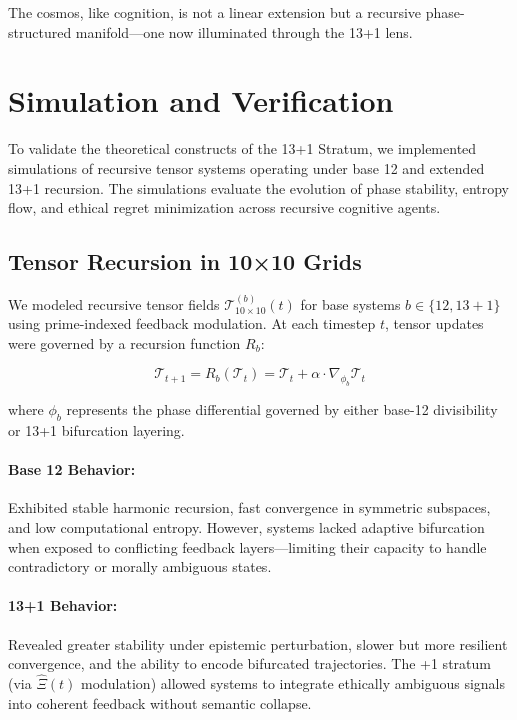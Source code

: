 \documentclass[12pt]{article}
\begin{document}
The cosmos, like cognition, is not a linear extension but a recursive phase-structured manifold—one now illuminated through the 13+1 lens.

\section{Simulation and Verification}

To validate the theoretical constructs of the 13+1 Stratum, we implemented simulations of recursive tensor systems operating under base 12 and extended 13+1 recursion. The simulations evaluate the evolution of phase stability, entropy flow, and ethical regret minimization across recursive cognitive agents.

\subsection{Tensor Recursion in 10×10 Grids}

We modeled recursive tensor fields $\mathcal{T}^{(b)}_{10 \times 10}(t)$ for base systems $b \in \{12, 13+1\}$ using prime-indexed feedback modulation. At each timestep $t$, tensor updates were governed by a recursion function $R_b$:

\[
\mathcal{T}_{t+1} = R_b(\mathcal{T}_t) = \mathcal{T}_t + \alpha \cdot \nabla_{\phi_b} \mathcal{T}_t
\]

where $\phi_b$ represents the phase differential governed by either base-12 divisibility or 13+1 bifurcation layering.

\paragraph{Base 12 Behavior:}  
Exhibited stable harmonic recursion, fast convergence in symmetric subspaces, and low computational entropy. However, systems lacked adaptive bifurcation when exposed to conflicting feedback layers—limiting their capacity to handle contradictory or morally ambiguous states.

\paragraph{13+1 Behavior:}  
Revealed greater stability under epistemic perturbation, slower but more resilient convergence, and the ability to encode bifurcated trajectories. The +1 stratum (via $\hat{\Xi}(t)$ modulation) allowed systems to integrate ethically ambiguous signals into coherent feedback without semantic collapse.
\end{document}
